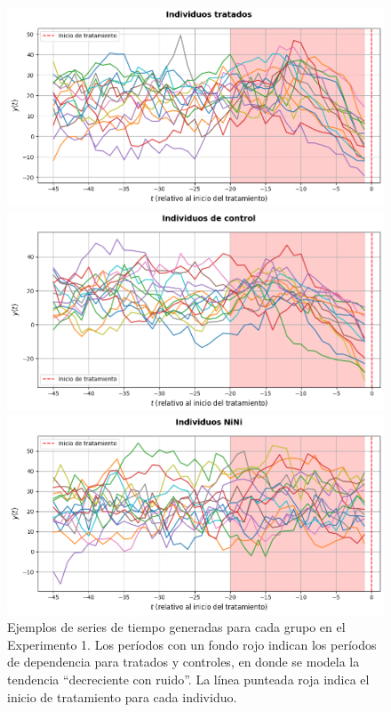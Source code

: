 \documentclass[../../main.tex]{subfiles}
\begin{document}
\begin{figure}[ht]
    \centering
    \begin{minipage}{0.48\textwidth}
        \centering
        \includegraphics[scale=0.27]{figs/Exp1/tratados_sim61.png}
    \end{minipage}
    \hfill
    \begin{minipage}{0.48\textwidth}
        \centering
        \includegraphics[scale=0.27]{figs/Exp1/controles_sim61.png}
    \end{minipage}
    \vspace{0.5em}
    \begin{minipage}{0.6\textwidth}
        \centering
        \includegraphics[scale=0.27]{figs/Exp1/ninis_sim61.png}
    \end{minipage}
    \caption{Ejemplos de series de tiempo generadas para cada grupo en el Experimento 1.
    Los períodos con un fondo rojo indican los períodos de dependencia para tratados y
    controles, en donde se modela la tendencia ``decreciente con ruido''. La línea
    punteada roja indica el inicio de tratamiento para cada individuo.}
    \label{fig:time_series_exp1}
\end{figure}
\end{document}

